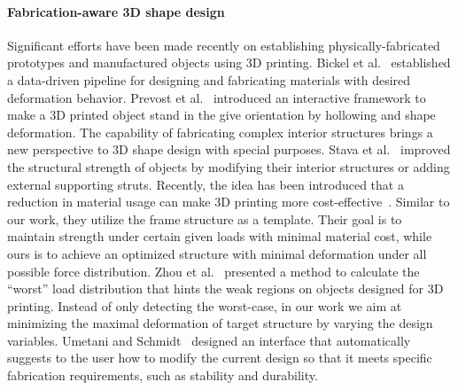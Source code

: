 \paragraph{Fabrication-aware 3D shape design}
Significant efforts have been made recently on establishing physically-fabricated prototypes and manufactured objects using 3D printing.
Bickel et al.~ established a data-driven pipeline for designing and fabricating materials with desired deformation behavior.
Prevost et al.~ introduced an interactive framework to make a 3D printed object stand in the give orientation by hollowing and shape deformation.
%
The capability of fabricating complex interior structures brings a new perspective to 3D shape design with special purposes.
Stava et al.~ improved the structural strength of objects by modifying their interior structures or adding external supporting struts. 
Recently, the idea has been introduced that a reduction in material usage can make 3D printing more cost-effective~\cite{wang:2013}.
Similar to our work, they utilize the frame structure as a template. 
Their goal is to maintain strength under certain given loads with minimal material cost, while ours is to achieve an optimized structure with minimal deformation under all possible force distribution.
%
Zhou et al.~ presented a method to calculate the ``worst'' load distribution that hints the weak regions on objects designed for 3D printing.
Instead of only detecting the worst-case, in our work we aim at minimizing the maximal deformation of target structure by varying the design variables.
Umetani and Schmidt~ designed an interface that automatically suggests to the user how to modify the current design so that it meets specific fabrication requirements, such as stability and durability.



